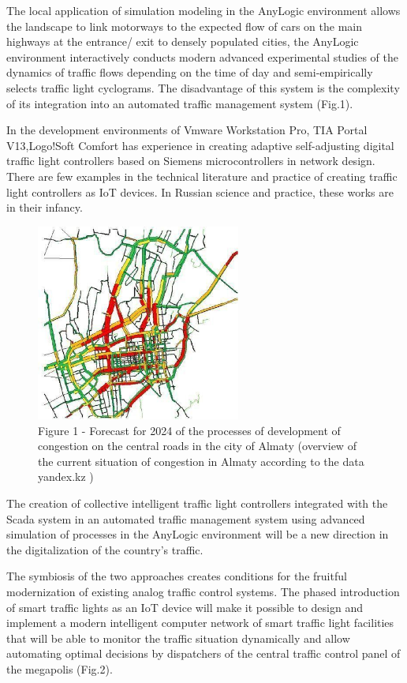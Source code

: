 \begin{multicols}{2}
The local application of simulation modeling in the AnyLogic environment
allows the landscape to link motorways to the expected flow of cars on
the main highways at the entrance/ exit to densely populated cities, the
AnyLogic environment interactively conducts modern advanced experimental
studies of the dynamics of traffic flows depending on the time of day
and semi-empirically selects traffic light cyclograms. The disadvantage
of this system is the complexity of its integration into an automated
traffic management system (Fig.1).

In the development environments of Vmware Workstation Pro, TIA Portal
V13,Logo!Soft Comfort has experience in creating adaptive self-adjusting
digital traffic light controllers based on Siemens microcontrollers in
network design. There are few examples in the technical literature and
practice of creating traffic light controllers as IoT devices. In
Russian science and practice, these works are in their infancy.
\end{multicols}

\begin{figure}[H]
	\centering
	\includegraphics[width=0.6\textwidth]{assets/73}
	\caption*{Figure 1 - Forecast for 2024 of the processes of development of congestion on the central roads in the city of Almaty (overview of the current situation of congestion in Almaty according to the data yandex.kz )}
\end{figure}

\begin{multicols}{2}
The creation of collective intelligent traffic light controllers
integrated with the Scada system in an automated traffic management
system using advanced simulation of processes in the AnyLogic
environment will be a new direction in the digitalization of the
country's traffic.

The symbiosis of the two approaches creates conditions for the fruitful
modernization of existing analog traffic control systems. The phased
introduction of smart traffic lights as an IoT device will make it
possible to design and implement a modern intelligent computer network
of smart traffic light facilities that will be able to monitor the
traffic situation dynamically and allow automating optimal decisions by
dispatchers of the central traffic control panel of the megapolis
(Fig.2).
\end{multicols}

